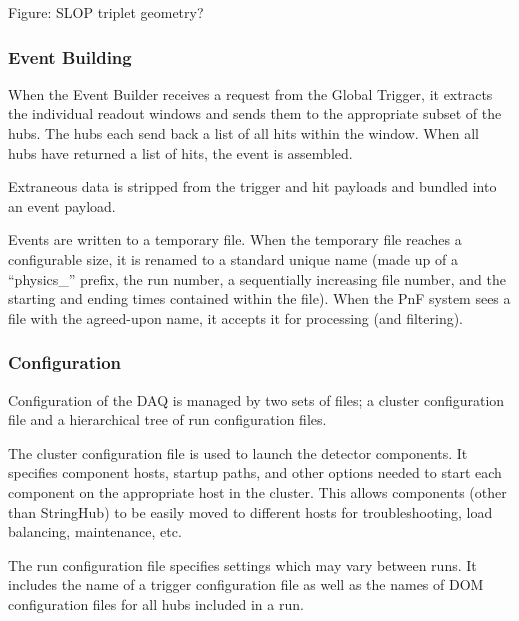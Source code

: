 Figure: SLOP triplet geometry?

\subsubsection{Event Building}

When the Event Builder receives a request from the Global Trigger, it extracts
the individual readout windows and sends them to the appropriate subset of the
hubs.  The hubs each send back a list of all hits within the window.  When all
hubs have returned a list of hits, the event is assembled.

Extraneous data is stripped from the trigger and hit payloads and bundled into
an event payload.

Events are written to a temporary file.  When the temporary
file reaches a configurable size, it is renamed to a standard unique name
(made up of a ``physics\_'' prefix, the run number, a sequentially increasing
file number, and the starting and ending times contained within the file).
When the PnF system sees a file with the agreed-upon name, it accepts it for
processing (and filtering).


\subsubsection{Configuration}

Configuration of the DAQ is managed by two sets of files; a cluster
configuration file and a hierarchical tree of run configuration files.

The cluster configuration file is used to launch the detector components.
It specifies component hosts, startup paths, and other options needed to start
each component on the appropriate host in the cluster.  This allows components
(other than StringHub) to be easily moved to different hosts for
troubleshooting, load balancing, maintenance, etc.

The run configuration file specifies settings which may vary between runs.
It includes the name of a trigger configuration file as well as the names of
DOM configuration files for all hubs included in a run.


